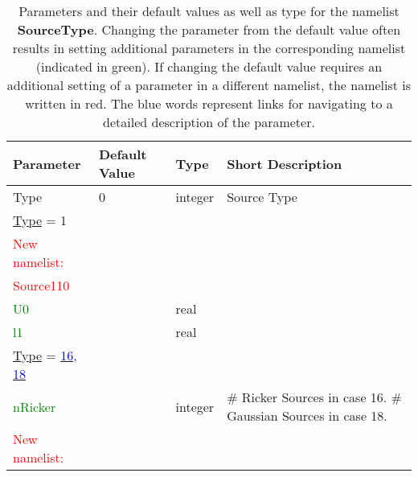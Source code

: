 \documentclass[12pt,twoside]{article}
\begin{document}
\begin{table}[H]
\caption{Parameters and their default values as well as type for the namelist \textbf{SourceType}.
         Changing the parameter from the default value often results in setting additional parameters in the corresponding namelist (indicated in green). 
         If changing the default value requires an additional setting of a parameter in a different namelist, the namelist is written in red. The blue words represent 
         links for navigating to a detailed description of the parameter.}
\begin{center}
\begin{tabular}{|p{4cm}|p{2.7cm}|p{2cm}|p{4cm}|}
\hline
Parameter & Default Value & Type & Short Description \\
\hline
\hline
Type & 0 & integer & Source Type\\
\hdashline
\uline{Type} = 1 & & &\\
\textcolor{red}{New namelist:} & & &\\
\textcolor{red}{Source110} & & &\\ 
\textcolor{green}{U0} &  & real & \\
\textcolor{green}{l1} &  & real & \\
\hdashline
\uline{Type} = \hyperlink{src16}{\textcolor{blue}{16}}, \hyperlink{src18}{\textcolor{blue}{18}} & & &\\
\textcolor{green}{nRicker} & & integer & \# Ricker Sources in case 16. \# Gaussian Sources in case 18.\\
\textcolor{red}{New namelist:} & & &\\

\end{tabular}
\end{center}
\end{table}
\end{document}
